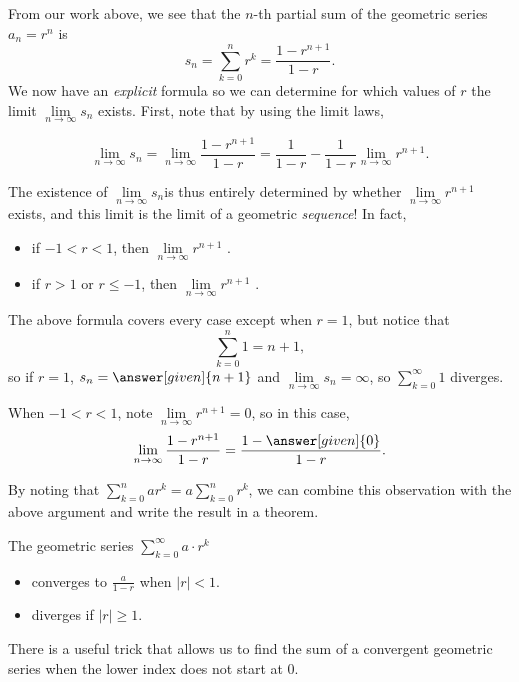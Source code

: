 \documentclass{ximera}
\begin{document}
From our work above, we see that the $n$-th partial sum of the
geometric series $a_n = r^n$ is
\[
s_n = \sum\limits_{k=0}^{n} r^k= \frac{1 - r^{n+1}}{1-r}.
\]
We now have an \emph{explicit} formula so we can determine for which values of $r$ the limit $\lim\limits_{n \to \infty} s_n$ exists.  First, note that by using the limit laws, 

\[
\lim\limits_{n \to \infty} s_n = \lim\limits_{n \to \infty}  \frac{1 - r^{n+1}}{1-r} =  \frac{1}{1-r}  - \frac{1}{1-r}  \lim\limits_{n \to \infty} r^{n+1}.
\]

The existence of $\lim\limits_{n \to \infty} s_n $is thus entirely determined by whether $\lim\limits_{n \to \infty} r^{n+1}$ exists, and this limit is the limit of a geometric \emph{sequence}!  In fact, 

\begin{itemize}
\item if $-1<r<1$, then $\lim\limits_{n \to \infty} r^{n+1}$ .
\item if $r>1$ or $r\le -1$, then $\lim\limits_{n \to \infty} r^{n+1}$ .
\end{itemize}

The above formula covers every case except when $r= 1$, but notice that  $$\sum\limits_{k=0}^n 1 = n+1,$$ so if $r=1$, $s_n = \answer[given]{n+1}$ and $\lim\limits_{n \to \infty} s_n = \infty$, so $\sum\limits_{k=0}^{\infty} 1$ diverges. 

When $-1<r<1$, note $\lim\limits_{n \to \infty} r^{n+1}=0$, so in this case,     \[
    \lim\limits_{n\to\infty}\frac{1 - r^{n+1}}{1-r} = \frac{1-\answer[given]{0}}{1-r}.
    \]

By noting that $\sum\limits_{k=0}^n ar^k = a \sum\limits_{k=0}^n r^k$, we can combine this observation with the above argument and write the result in a theorem.

\begin{theorem}
  The geometric series $\sum\limits_{k= 0}^\infty a \cdot r^k$ 
  
  \begin{itemize} 
  \item converges to $\frac{a}{1-r}$ when $|r| < 1$.
  \item diverges if $|r| \geq 1$.  
  \end{itemize}
  \end{theorem}

There is a useful trick that allows us to find the sum of a convergent geometric series when the lower index does not start at $0$.  
\end{document}
